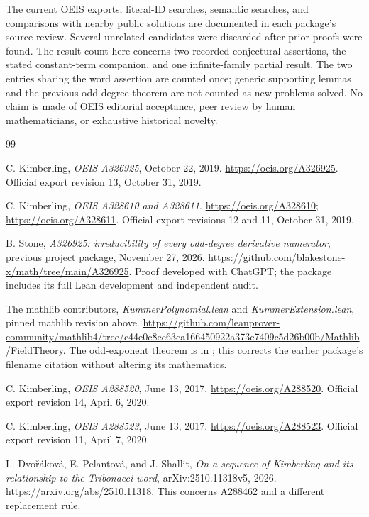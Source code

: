 \documentclass[11pt]{article}
\begin{document}
The current OEIS exports, literal-ID searches, semantic searches,
and comparisons with nearby public solutions are documented in each
package's source review. Several unrelated candidates were discarded
after prior proofs were found. The result count here concerns two
recorded conjectural assertions, the stated constant-term companion,
and one infinite-family partial result. The two entries sharing the
word assertion are counted once; generic supporting lemmas and the
previous odd-degree theorem are not counted as new problems solved.
No claim is made of OEIS editorial acceptance, peer review by human
mathematicians, or exhaustive historical novelty.

\begin{thebibliography}{99}
\raggedright
{}
C. Kimberling, \emph{OEIS A326925}, October 22, 2019.
\url{https://oeis.org/A326925}.
Official export revision 13, October 31, 2019.

C. Kimberling, \emph{OEIS A328610 and A328611}.
\url{https://oeis.org/A328610};
\url{https://oeis.org/A328611}.
Official export revisions 12 and 11, October 31, 2019.

B. Stone, \emph{A326925: irreducibility of every odd-degree derivative
numerator}, previous project package, November 27, 2026.
\url{https://github.com/blakestone-x/math/tree/main/A326925}.
Proof developed with ChatGPT; the package includes its full Lean
development and independent audit.

The mathlib contributors, \emph{KummerPolynomial.lean} and
\emph{KummerExtension.lean}, pinned mathlib revision above.
\url{https://github.com/leanprover-community/mathlib4/tree/c44e0c8ee63ca166450922a373c7409c5d26b00b/Mathlib/FieldTheory}.
The odd-exponent theorem
is in ; this corrects the earlier
package's filename citation without altering its mathematics.

C. Kimberling, \emph{OEIS A288520}, June 13, 2017.
\url{https://oeis.org/A288520}.
Official export revision 14, April 6, 2020.

C. Kimberling, \emph{OEIS A288523}, June 13, 2017.
\url{https://oeis.org/A288523}.
Official export revision 11, April 7, 2020.

L. Dvo\v{r}\'akov\'a, E. Pelantov\'a, and J. Shallit,
\emph{On a sequence of Kimberling and its relationship to the
Tribonacci word}, arXiv:2510.11318v5, 2026.
\url{https://arxiv.org/abs/2510.11318}.
This concerns A288462 and a different replacement rule.


\end{thebibliography}
\end{document}
